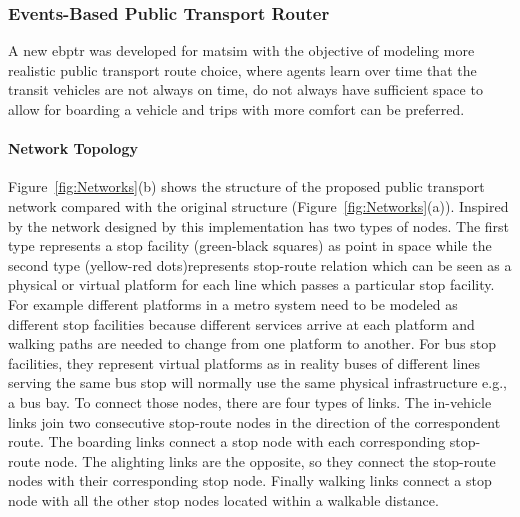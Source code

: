 \subsubsection{Events-Based Public Transport Router} 
\label{sec:RouterStructure}
A new \gls{ebptr} was developed for \gls{matsim} with the objective of modeling more realistic public transport route choice, where agents learn over time that the transit vehicles are not always on time, do not always have sufficient space to allow for boarding a vehicle and trips with more comfort can be preferred.

\paragraph{Network Topology}

Figure~\ref{fig:Networks}(b) shows the structure of the proposed public transport network compared with the original structure (Figure~\ref{fig:Networks}(a)). Inspired by the network designed by \citet{SpiessFlorian_TransResB_1989} this implementation has two types of nodes. The first type represents a stop facility (green-black squares) as point in space while the second type (yellow-red dots)represents stop-route relation which can be seen as a physical or virtual platform for each line which passes a particular stop facility. For example different platforms in a metro system need to be modeled as different stop facilities because different services arrive at each platform and walking paths are needed to change from one platform to another. For bus stop facilities, they represent virtual platforms as in reality buses of different lines serving the same bus stop will normally use the same physical infrastructure e.g., a bus bay. To connect those nodes, there are four types of links. The in-vehicle links join two consecutive stop-route nodes in the direction of the correspondent route. The boarding links connect a stop node with each corresponding stop-route node. The alighting links are the opposite, so they connect the stop-route nodes with their corresponding stop node. Finally walking links connect a stop node with all the other stop nodes located within a walkable distance.

